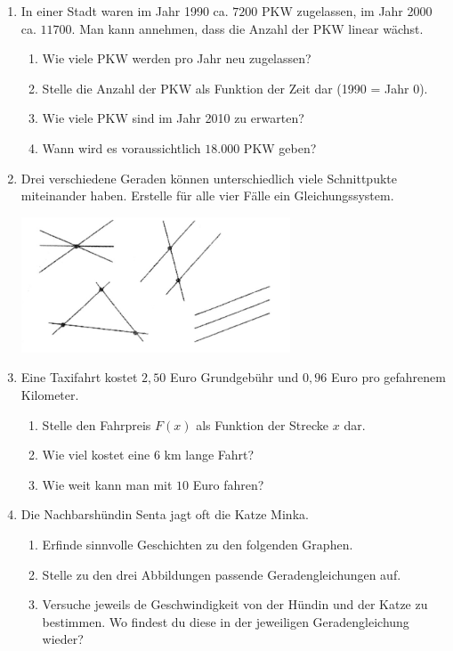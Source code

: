 \documentclass[a4paper, twoside, parskip, 10pt, smallheadings]{scrbook}
\theoremstyle{plain}
\theoremstyle{definition}
\newcommand{\bn}{\begin{enumerate}}
\newcommand{\en}{\end{enumerate}}
\begin{document}
\begin{enumerate}
\item In einer Stadt waren im Jahr 1990 ca. $7200$ PKW zugelassen, im Jahr 2000 ca. $11700$. Man kann annehmen, dass die Anzahl der PKW linear wächst.
\bn \item Wie viele PKW werden pro Jahr neu zugelassen?
\item Stelle die Anzahl der PKW als Funktion der Zeit dar (1990 = Jahr 0).
\item Wie viele PKW sind im Jahr 2010 zu erwarten?
\item Wann wird es voraussichtlich $18.000$ PKW geben?\en




\item

Drei verschiedene Geraden können unterschiedlich viele Schnittpukte miteinander haben. Erstelle für
alle vier Fälle ein Gleichungssystem.
\begin{center}
\includegraphics[width=8cm]{2te/linearefunktion/bilder/scanimage200503.jpg}
\end{center}



\item Eine Taxifahrt kostet $2,50$  Euro Grundgebühr und $0,96$ Euro pro gefahrenem Kilometer.
\bn \item Stelle den Fahrpreis $F(x)$ als Funktion der Strecke $x$ dar.
\item Wie viel kostet eine $6$ km lange Fahrt?
\item Wie weit kann man mit $10$  Euro  fahren? \en



\item Die Nachbarshündin Senta jagt oft die Katze Minka. 

\bn \item Erfinde sinnvolle Geschichten zu den folgenden Graphen.
\item Stelle zu den drei Abbildungen passende Geradengleichungen auf.
\item Versuche jeweils de Geschwindigkeit von der Hündin und der Katze zu bestimmen. Wo findest du diese in der jeweiligen Geradengleichung wieder?
\en
\begin{center}


\end{center}
\end{enumerate}
\end{document}
